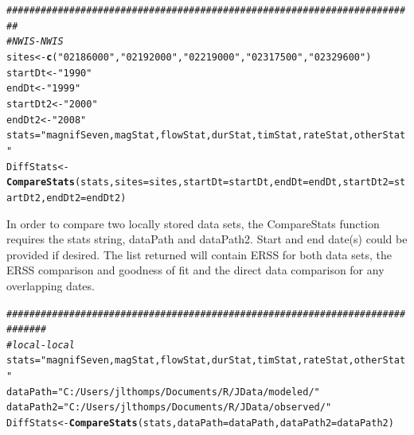 \documentclass[a4paper,11pt]{article}\usepackage[]{graphicx}\usepackage[]{color}
\makeatletter
\newcommand{\hlstr}[1]{\textcolor[rgb]{0.192,0.494,0.8}{#1}}%
\newcommand{\hlcom}[1]{\textcolor[rgb]{0.678,0.584,0.686}{\textit{#1}}}%
\newcommand{\hlstd}[1]{\textcolor[rgb]{0.345,0.345,0.345}{#1}}%
\newcommand{\hlkwb}[1]{\textcolor[rgb]{0.69,0.353,0.396}{#1}}%
\newcommand{\hlkwc}[1]{\textcolor[rgb]{0.333,0.667,0.333}{#1}}%
\newcommand{\hlkwd}[1]{\textcolor[rgb]{0.737,0.353,0.396}{\textbf{#1}}}%
\newenvironment{kframe}{%
 \def\at@end@of@kframe{}%
 \ifinner\ifhmode%
  \def\at@end@of@kframe{\end{minipage}}%
  \begin{minipage}{\columnwidth}%
 \fi\fi%
 \def\FrameCommand##1{\hskip\@totalleftmargin \hskip-\fboxsep
 \colorbox{shadecolor}{##1}\hskip-\fboxsep
     \hskip-\linewidth \hskip-\@totalleftmargin \hskip\columnwidth}%
 \MakeFramed {\advance\hsize-\width
   \@totalleftmargin\z@ \linewidth\hsize
   \@setminipage}}%
 {\par\unskip\endMakeFramed%
 \at@end@of@kframe}
\newenvironment{knitrout}{}{} %
\makeatother
\begin{document}
\begin{knitrout}
\color{fgcolor}\begin{kframe}
\begin{alltt}
\hlcom{########################################################################}
\hlcom{# NWIS-NWIS}
\hlstd{sites} \hlkwb{<-} \hlkwd{c}\hlstd{(}\hlstr{"02186000"}\hlstd{,}\hlstr{"02192000"}\hlstd{,}\hlstr{"02219000"}\hlstd{,}\hlstr{"02317500"}\hlstd{,}\hlstr{"02329600"}\hlstd{)}
\hlstd{startDt} \hlkwb{<-} \hlstr{"1990"}
\hlstd{endDt} \hlkwb{<-} \hlstr{"1999"}
\hlstd{startDt2} \hlkwb{<-} \hlstr{"2000"}
\hlstd{endDt2} \hlkwb{<-} \hlstr{"2008"}
\hlstd{stats}\hlkwb{=}\hlstr{"magnifSeven,magStat,flowStat,durStat,timStat,rateStat,otherStat"}
\hlstd{DiffStats} \hlkwb{<-} \hlkwd{CompareStats}\hlstd{(stats,}\hlkwc{sites}\hlstd{=sites,}\hlkwc{startDt}\hlstd{=startDt,}\hlkwc{endDt}\hlstd{=endDt,}\hlkwc{startDt2}\hlstd{=startDt2,}\hlkwc{endDt2}\hlstd{=endDt2)}
\end{alltt}
\end{kframe}
\end{knitrout}

In order to compare two locally stored data sets, the CompareStats function requires the stats string, dataPath and dataPath2. Start and end date(s) could be provided if desired. The list returned will contain ERSS for both data sets, the ERSS comparison and goodness of fit and the direct data comparison for any overlapping dates. 

\begin{knitrout}
\color{fgcolor}\begin{kframe}
\begin{alltt}
\hlcom{#############################################################################}
\hlcom{# local-local}
\hlstd{stats}\hlkwb{=}\hlstr{"magnifSeven,magStat,flowStat,durStat,timStat,rateStat,otherStat"}
\hlstd{dataPath}\hlkwb{=}\hlstr{"C:/Users/jlthomps/Documents/R/JData/modeled/"}
\hlstd{dataPath2}\hlkwb{=}\hlstr{"C:/Users/jlthomps/Documents/R/JData/observed/"}
\hlstd{DiffStats} \hlkwb{<-} \hlkwd{CompareStats}\hlstd{(stats,}\hlkwc{dataPath}\hlstd{=dataPath,}\hlkwc{dataPath2}\hlstd{=dataPath2)}
\end{alltt}
\end{kframe}
\end{knitrout}

\FloatBarrier

\end{document}
